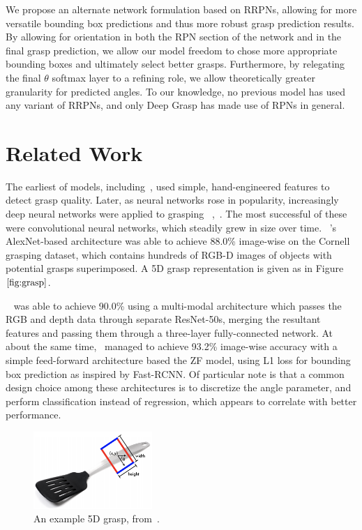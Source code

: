 \documentclass[10pt,twocolumn,letterpaper]{article}
\begin{document}
We propose an alternate network formulation based on RRPNs, allowing for more versatile bounding box predictions and thus more robust grasp prediction results. By allowing for orientation in both the RPN section of the network and in the final grasp prediction, we allow our model freedom to chose more appropriate bounding boxes and ultimately select better grasps. Furthermore, by relegating the final $\theta$ softmax layer to a refining role, we allow theoretically greater granularity for predicted angles. To our knowledge, no previous model has used any variant of RRPNs, and only Deep Grasp has made use of RPNs in general. 


\section{Related Work}


The earliest of models, including~\cite{edelman96}, used simple, hand-engineered features to detect grasp quality. Later, as neural networks rose in popularity, increasingly deep neural networks were applied to grasping ~\cite{pinto2015},~\cite{redmon14}. The most successful of these were convolutional neural networks, which steadily grew in size over time. ~\cite{redmon14}'s AlexNet-based architecture was able to achieve 88.0\% image-wise on the Cornell grasping dataset, which contains hundreds of RGB-D images of objects with potential grasps superimposed. A 5D grasp representation is given as in Figure $\ref{fig:grasp}$.

~\cite{kumra16} was able to achieve 90.0\% using a multi-modal architecture which passes the RGB and depth data through separate ResNet-50s, merging the resultant features and passing them through a three-layer fully-connected network. At about the same time,~\cite{guo17} managed to achieve 93.2\% image-wise accuracy with a simple feed-forward architecture based the ZF model, using L1 loss for bounding box prediction as inspired by Fast-RCNN. Of particular note is that a common design choice among these architectures is to discretize the angle parameter, and perform classification instead of regression, which appears to correlate with better performance.

\begin{figure}
    \centering
    \includegraphics[width=0.4\textwidth]{latex/grasp.png}
    \caption{An example 5D grasp, from~\cite{redmon14}.}
    \label{fig:grasp}
\end{figure}
\end{document}

